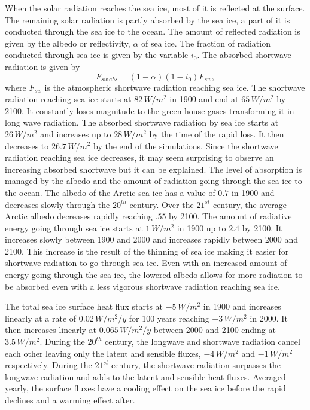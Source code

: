 When the solar radiation reaches the sea ice, most of it is reflected at the surface. The remaining solar radiation is partly absorbed by the sea ice, a part of it is conducted through the sea ice to the ocean. The amount of reflected radiation is given by the albedo or reflectivity, $\alpha$ of sea ice. The fraction of radiation conducted through sea ice is given by the variable $i_0$. The absorbed shortwave radiation is given by
 \begin{equation}
F_{sw\,abs} = (1-\alpha)(1-i_0)F_{sw},
\end{equation}
where $F_{sw}$ is the atmospheric shortwave radiation reaching sea ice. The shortwave radiation reaching sea ice starts at $82\,W/m^2$ in 1900 and end at $65\,W/m^2$ by 2100. It constantly loses magnitude to the green house gases transforming it in long wave radiation. The absorbed shortwave radiation by sea ice starts at $26\,W/m^2$ and increases up to $28\,W/m^2$ by the time of the rapid loss. It then decreases to $26.7\,W/m^2$ by the end of the simulations. Since the shortwave radiation reaching sea ice decreases, it may seem surprising to observe an increasing absorbed shortwave but it can be explained. The level of absorption is managed by the albedo and the amount of radiation going through the sea ice to the ocean. The albedo of the Arctic sea ice has a value of $0.7$ in 1900 and decreases slowly through the $20^{th}$ century. Over the $21^{st}$ century, the average Arctic albedo decreases rapidly reaching $.55$ by 2100. The amount of radiative energy going through sea ice starts at $1\,W/m^2$ in 1900 up to $2.4$ by 2100. It increases slowly between 1900 and 2000 and increases rapidly between 2000 and 2100. This increase is the result of the thinning of sea ice making it easier for shortwave radiation to go through sea ice. Even with an increased amount of energy going through the sea ice, the lowered albedo allows for more radiation to be absorbed even with a less vigorous shortwave radiation reaching sea ice. 

The total sea ice surface heat flux starts at $-5\,W/m^2$ in 1900 and increases linearly at a rate of $0.02\,W/m^2/y$ for 100 years reaching $-3\,W/m^2$ in 2000. It then increases linearly at $0.065\,W/m^2/y$ between 2000 and 2100 ending at $3.5\,W/m^2$. During the $20^{th}$ century, the longwave and shortwave radiation cancel each other leaving only the latent and sensible fluxes, $-4\,W/m^2$ and $-1\,W/m^2$ respectively. During the $21^{st}$ century, the shortwave radiation surpasses the longwave radiation and adds to the latent and sensible heat fluxes. Averaged yearly, the surface fluxes have a cooling effect on the sea ice before the rapid declines and a warming effect after. 

